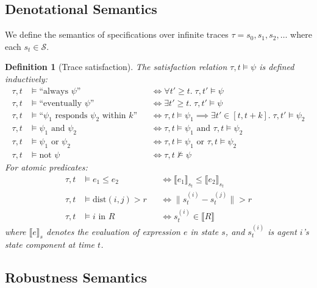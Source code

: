 \documentclass[11pt]{article}
\newtheorem{definition}[theorem]{Definition}
\newcommand{\calS}{\mathcal{S}}
\newcommand{\norm}[1]{\lVert #1 \rVert}
\begin{document}
\subsection{Denotational Semantics}

We define the semantics of specifications over infinite traces
$\tau = s_0, s_1, s_2, \ldots$ where each $s_t \in \calS$.

\begin{definition}[Trace satisfaction]
The satisfaction relation $\tau, t \models \psi$ is defined inductively:
\begin{align}
  \tau, t &\models \text{``always } \psi\text{''} &&\iff \forall t' \geq t.\; \tau, t' \models \psi \\
  \tau, t &\models \text{``eventually } \psi\text{''} &&\iff \exists t' \geq t.\; \tau, t' \models \psi \\
  \tau, t &\models \text{``}\psi_1 \text{ responds } \psi_2 \text{ within } k\text{''} &&\iff
    \tau, t \models \psi_1 \implies \exists t' \in [t, t+k].\; \tau, t' \models \psi_2 \\
  \tau, t &\models \psi_1 \text{ and } \psi_2 &&\iff \tau, t \models \psi_1 \text{ and } \tau, t \models \psi_2 \\
  \tau, t &\models \psi_1 \text{ or } \psi_2 &&\iff \tau, t \models \psi_1 \text{ or } \tau, t \models \psi_2 \\
  \tau, t &\models \text{not } \psi &&\iff \tau, t \not\models \psi
\end{align}
For atomic predicates:
\begin{align}
  \tau, t &\models e_1 \leq e_2 &&\iff \llbracket e_1 \rrbracket_{s_t} \leq \llbracket e_2 \rrbracket_{s_t} \\
  \tau, t &\models \text{dist}(i, j) > r &&\iff \norm{s_t^{(i)} - s_t^{(j)}} > r \\
  \tau, t &\models i \text{ in } R &&\iff s_t^{(i)} \in \llbracket R \rrbracket
\end{align}
where $\llbracket e \rrbracket_{s}$ denotes the evaluation of expression $e$
in state $s$, and $s_t^{(i)}$ is agent $i$'s state component at time $t$.
\end{definition}

\subsection{Robustness Semantics}
\end{document}
